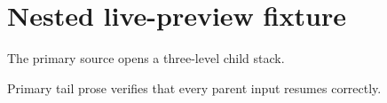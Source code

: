 \documentclass{article}
\begin{document}
\section*{Nested live-preview fixture}
The primary source opens a three-level child stack.

\newpage


\newpage
Primary tail prose verifies that every parent input resumes correctly.
\end{document}
